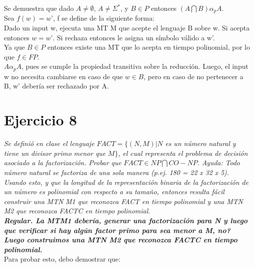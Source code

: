 \documentclass[lnbip]{svmultln}
\begin{document}
Se demuestra que dado $A \ne \emptyset$, $A \ne \Sigma^{*}$, y $B \in P$ entonces $(A \bigcap B) \alpha_{p} A$. \\

Sea $f(w) = w’$, f se define de la siguiente forma: \\ 

Dado un input w, ejecuta una MT M que acepte el lenguaje B sobre w. Si acepta entonces $w = w’$. Si rechaza entonces le asigna un símbolo válido a w’. \\

Ya que $B \in P$ entonces existe una MT que lo acepta en tiempo polinomial, por lo que $f \in FP$. \\

$A \alpha_{p} A$, pues se cumple la propiedad transitiva sobre la reducción. Luego, el input w no necesita cambiarse en caso de que $w \in B$, pero en caso de no pertenecer a B, w’ debería ser rechazado por A. \\

\section{Ejercicio 8}

\textit{Se definió en clase el lenguaje $FACT = \{(N, M) | N$ es un número natural y tiene un divisor primo menor que $M\}$, el cual representa el problema de decisión asociado a la factorización. Probar que $FACT \in NP \bigcap CO-NP$. Ayuda: Todo número natural se factoriza de una sola manera (p.ej. 180 = 22 x 32 x 5). Usando esto, y que la longitud de la representación binaria de la factorización de un número es polinomial con respecto a su tamaño, entonces resulta fácil construir una MTN M1 que reconozca FACT en tiempo polinomial y una MTN M2 que reconozca FACTC en tiempo polinomial.} \\

\textbf{\textit{Regular. La MTM1  debería, generar una factorización para N y luego que verificar si hay algún factor primo para sea menor a M, no? Luego construimos una MTN M2 que reconozca FACTC en tiempo polinomial.}} \\

Para probar esto, debo demostrar que:
\end{document}
